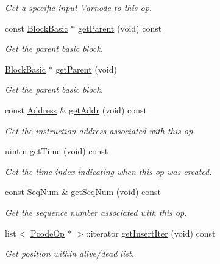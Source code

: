 \begin{DoxyCompactItemize}
\begin{DoxyCompactList}\small\item\em Get a specific input \mbox{\hyperlink{class_varnode}{Varnode}} to this op. \end{DoxyCompactList}\item 
const \mbox{\hyperlink{class_block_basic}{Block\+Basic}} $\ast$ \mbox{\hyperlink{class_pcode_op_ab3f2abf80e742d5c33e41d68d36d3e33}{get\+Parent}} (void) const
\begin{DoxyCompactList}\small\item\em Get the parent basic block. \end{DoxyCompactList}\item 
\mbox{\hyperlink{class_block_basic}{Block\+Basic}} $\ast$ \mbox{\hyperlink{class_pcode_op_a047ba0aec5d9ead44390d69834ab3cab}{get\+Parent}} (void)
\begin{DoxyCompactList}\small\item\em Get the parent basic block. \end{DoxyCompactList}\item 
const \mbox{\hyperlink{class_address}{Address}} \& \mbox{\hyperlink{class_pcode_op_a73fe9f0a388f65445e16fbb506af9234}{get\+Addr}} (void) const
\begin{DoxyCompactList}\small\item\em Get the instruction address associated with this op. \end{DoxyCompactList}\item 
uintm \mbox{\hyperlink{class_pcode_op_a496e0f6fc032ebc815809269b169bd7a}{get\+Time}} (void) const
\begin{DoxyCompactList}\small\item\em Get the time index indicating when this op was created. \end{DoxyCompactList}\item 
const \mbox{\hyperlink{class_seq_num}{Seq\+Num}} \& \mbox{\hyperlink{class_pcode_op_a050ebe7063f5e79c2c8a97cd0df9c61a}{get\+Seq\+Num}} (void) const
\begin{DoxyCompactList}\small\item\em Get the sequence number associated with this op. \end{DoxyCompactList}\item 
list$<$ \mbox{\hyperlink{class_pcode_op}{Pcode\+Op}} $\ast$ $>$\+::iterator \mbox{\hyperlink{class_pcode_op_ab756db5a0f3c10576aa34fe6d65a8d16}{get\+Insert\+Iter}} (void) const
\begin{DoxyCompactList}\small\item\em Get position within alive/dead list. \end{DoxyCompactList}\item 

\end{DoxyCompactItemize}

